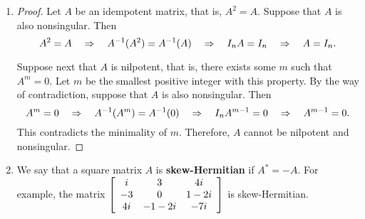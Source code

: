 \begin{enumerate}[!HW!, start=1]
\item \begin{proof}
Let $A$ be an idempotent matrix, that is, $A^2=A$. Suppose that $A$ is also nonsingular. Then 
\[A^2 = A \qRightarrow A^{-1}(A^2) = A^{-1}(A)  \qRightarrow I_nA = I_n \qRightarrow A = I_n.\]

Suppose next that $A$ is nilpotent, that is, there exists some $m$ such that $A^m = 0$. Let $m$ be the smallest positive integer with this property. By the way of contradiction, suppose that $A$ is also nonsingular. Then 
\[A^m = 0 \qRightarrow A^{-1}(A^m) = A^{-1}(0)  \qRightarrow I_nA^{m-1} = 0 \qRightarrow A^{m-1} = 0.\] This contradicts the minimality of $m$. Therefore, $A$ cannot be nilpotent and nonsingular.
\end{proof}

\item We say that a square matrix $A$ is \textbf{skew-Hermitian} if $A^* = -A$. For example, the matrix $\mtx{ccc}{i & 3 & 4i\\ -3 & 0 & 1-2i \\ 4i & -1-2i & -7i}$ is skew-Hermitian.
\end{enumerate}

\vspace{-15 pt}